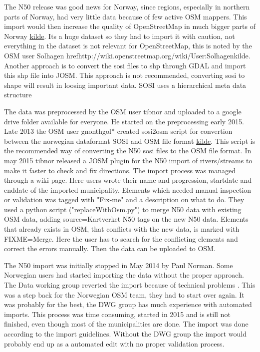 The N50 release was good news for Norway, since regions, especially in northern parts of Norway, had very little data because of few active OSM mappers. This import would then increase the quality of OpenStreetMap in much bigger parts of Norway \href{http://www.digi.no/artikler/kartskatt-til-alle/286539}{kilde}. Its a huge dataset so they had to import it with caution, not everything in the dataset is not relevant for OpenStreetMap, this is noted by the OSM user Solhagen href{http://wiki.openstreetmap.org/wiki/User:Solhagen}{kilde}. Another approach is to convert the sosi files to shp through GDAL and import this shp file into JOSM. This approach is not recommended, converting sosi to shape will result in loosing important data.  SOSI uses a hierarchical meta data structure  

The data was preprocessed by the OSM user tibnor and uploaded to a google drive folder available for everyone. He started on the preprocessing early 2015. Late 2013 the OSM user gnonthgol* created sosi2osm script for convertion between the norwegian dataformat SOSI and OSM file format \href{https://lists.nuug.no/pipermail/kart/2013-October/004314.html}{kilde}. This script is the recommended way of converting the N50 sosi files to the OSM file format. In may 2015 tibnor released a JOSM plugin for the N50 import of rivers/streams to make it faster to check and fix directions. The import process was managed through a wiki page. Here users wrote their name and progression, startdate and enddate of the imported municipality. Elements which needed manual inspection or validation was tagged with "Fix-me" and a description on what to do. They used a python script ("replaceWithOsm.py") to merge N50 data with existing OSM data, adding source=Kartverket N50 tags on the new N50 data. Elements that already exists in OSM, that conflicts with the new data, is marked with FIXME=Merge. Here the user has to search for the conflicting elements and correct the errors manually. Then the data can be uploaded to OSM. 

The N50 import was initially stopped in May 2014 by Paul Norman. Some Norwegian users had started importing the data without the proper approach. The Data working group reverted the import because of technical problems \cite{Didriksen2014}. This was a step back for the Norwegian OSM team, they had to start over again. It was probably for the best, the DWG group has much experience with automated imports. This process was time consuming, started in 2015 and is still not finished, even though most of the municipalities are done. The import was done according to the import guidelines. Without the DWG group the import would probably end up as a automated edit with no proper validation process. 


